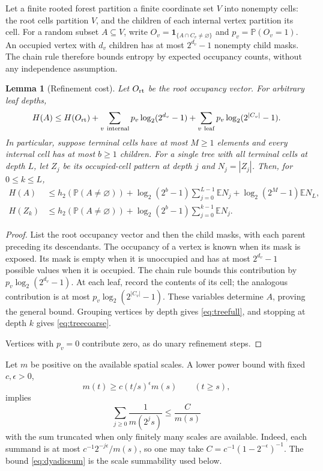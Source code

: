 \documentclass[11pt]{amsart}
\newtheorem{lemma}[theorem]{Lemma}
\theoremstyle{remark}
\newcommand{\Prob}{\mathbb P}
\newcommand{\E}{\mathbb E}
\newcommand{\one}{\mathbf 1}
\begin{document}
Let a finite rooted forest partition a finite coordinate set $V$ into
nonempty cells: the root cells partition $V$, and the children of each
internal vertex partition its cell. For a random subset $A\subseteq V$,
write $O_v=\one_{\{A\cap C_v\ne\varnothing\}}$ and $p_v=\Prob(O_v=1)$.
An occupied vertex with $d_v$ children has at most $2^{d_v}-1$ nonempty
child masks. The chain rule therefore bounds entropy by expected
occupancy counts, without any independence assumption.

\begin{lemma}[Refinement cost]\label{cor:forestcost}
Let $O_{\rm rt}$ be the root occupancy vector. For arbitrary leaf depths,
\[
 H(A)\le H(O_{\rm rt})
 +\sum_{v\ \mathrm{internal}}p_v\log_2(2^{d_v}-1)
 +\sum_{v\ \mathrm{leaf}}p_v\log_2(2^{|C_v|}-1).
\]
In particular, suppose terminal cells have at most $M\ge1$ elements and
every internal cell has at most $b\ge1$ children. For a single tree with
all terminal cells at depth $L$, let $Z_j$ be its occupied-cell pattern
at depth $j$ and $N_j=|Z_j|$. Then, for $0\le k\le L$,
\begin{align}
 H(A)&\le h_2(\Prob(A\ne\varnothing))
 +\log_2(2^b-1)\sum_{j=0}^{L-1}\E N_j
 +\log_2(2^M-1)\E N_L,\label{eq:treefull}\\
 H(Z_k)&\le h_2(\Prob(A\ne\varnothing))
 +\log_2(2^b-1)\sum_{j=0}^{k-1}\E N_j.\label{eq:treecoarse}
\end{align}
\end{lemma}
\begin{proof}
List the root occupancy vector and then the child masks, with each
parent preceding its descendants. The occupancy of a vertex is known
when its mask is exposed. Its mask is empty when it is unoccupied and
has at most $2^{d_v}-1$ possible values when it is occupied. The chain
rule bounds this contribution by $p_v\log_2(2^{d_v}-1)$. At each leaf,
record the contents of its cell; the analogous contribution is at most
$p_v\log_2(2^{|C_v|}-1)$. These variables determine $A$, proving the
general bound. Grouping vertices by depth gives \eqref{eq:treefull},
and stopping at depth $k$ gives \eqref{eq:treecoarse}.

Vertices with $p_v=0$ contribute zero, as do unary refinement steps.
\end{proof}

Let $m$ be positive on the available spatial scales. A lower power bound
with fixed $c,\epsilon>0$,
\begin{equation}\label{eq:massgrowth}
 m(t)\ge c(t/s)^\epsilon m(s)\qquad(t\ge s),
\end{equation}
implies
\begin{equation}\label{eq:dyadicsum}
 \sum_{j\ge0}\frac1{m(2^js)}\le\frac{C}{m(s)}
\end{equation}
with the sum truncated when only finitely many scales are available.
Indeed, each summand is at most $c^{-1}2^{-j\epsilon}/m(s)$, so one may
take $C=c^{-1}(1-2^{-\epsilon})^{-1}$.
The bound \eqref{eq:dyadicsum} is the scale summability used below.
\end{document}
